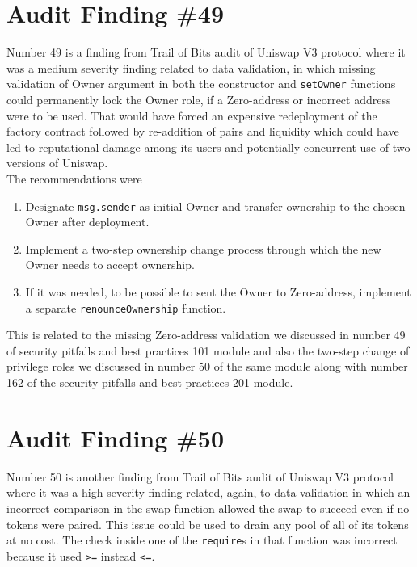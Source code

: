\section{Audit Finding \#49}

Number 49 is a finding from Trail of Bits audit of Uniswap V3 protocol where it was a medium severity finding related to data validation, in which missing validation of Owner argument in both the constructor and \verb|setOwner| functions could permanently lock the Owner role, if a Zero-address or incorrect address were to be used. That would have forced an expensive redeployment of the factory contract followed by re-addition of pairs and liquidity which could have led to reputational damage among its users and potentially concurrent use of two versions of Uniswap.\\

The recommendations were
    \begin{enumerate}
    \item Designate \verb|msg.sender| as initial Owner and transfer ownership to the chosen Owner after deployment.
    \item Implement a two-step ownership change process through which the new Owner needs to accept ownership.
    \item If it was needed, to be possible to sent the Owner to Zero-address, implement a separate \verb|renounceOwnership| function.
    \end{enumerate}    
This is related to the missing Zero-address validation we discussed in number 49 of security pitfalls and best practices 101 module and also the two-step change of privilege roles we discussed in number 50 of the same module along with number 162 of the security pitfalls and best practices 201 module.

\section{Audit Finding \#50}

Number 50 is another finding from Trail of Bits audit of Uniswap V3 protocol where it was a high severity finding related, again, to data validation in which an incorrect comparison in the swap function allowed the swap to succeed even if no tokens were paired. This issue could be used to drain any pool of all of its tokens at no cost. The check inside one of the \verb|require|s in that function was incorrect because it used \verb|>=| instead \verb|<=|.\\

